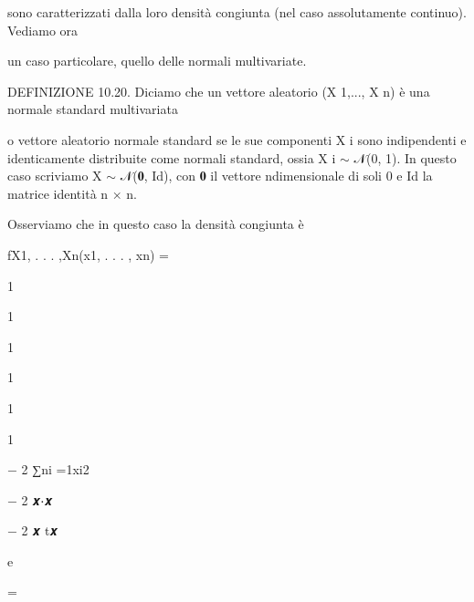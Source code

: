 \documentclass[a4paper,portrait,12pt]{article}
\begin{document}
\begin{flushleft}
sono caratterizzati dalla loro densit\`{a} congiunta (nel caso assolutamente continuo). Vediamo ora
\end{flushleft}


\begin{flushleft}
un caso particolare, quello delle normali multivariate.
\end{flushleft}


\begin{flushleft}
DEFINIZIONE 10.20. Diciamo che un vettore aleatorio (X 1,..., X n) \`{e} una normale standard multivariata
\end{flushleft}


\begin{flushleft}
o vettore aleatorio normale standard se le sue componenti X i sono indipendenti e identicamente distribuite come normali standard, ossia X i $\sim$ 𝒩(0, 1). In questo caso scriviamo X $\sim$ 𝒩(𝟎, Id), con 𝟎 il vettore ndimensionale di soli 0 e Id la matrice identit\`{a} n × n.
\end{flushleft}


\begin{flushleft}
Osserviamo che in questo caso la densit\`{a} congiunta \`{e}
\end{flushleft}


\begin{flushleft}
fX1, . . . ,Xn(x1, . . . , xn) =
\end{flushleft}





1


1


1


1


1


1


\begin{flushleft}
$-$ 2 ∑ni =1xi2
\end{flushleft}


\begin{flushleft}
$-$ 2 𝒙⋅𝒙
\end{flushleft}


\begin{flushleft}
$-$ 2 𝒙 t𝒙
\end{flushleft}


\begin{flushleft}
e
\end{flushleft}


=
\end{document}
